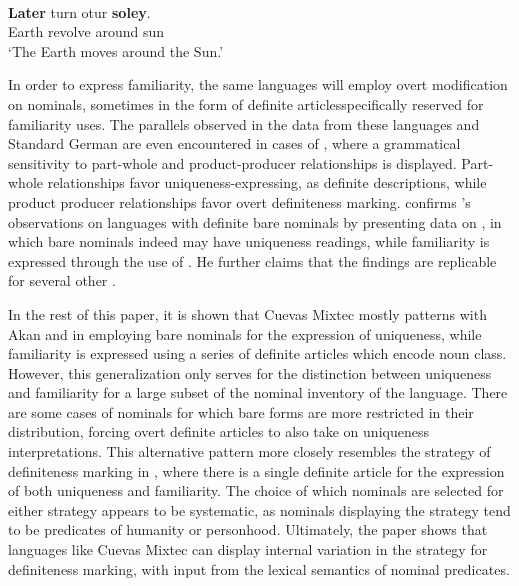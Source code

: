 \documentclass[output=paper,modfonts,nonflat]{langsci/langscibook}
\begin{document}
\begin{exe}
\ex \label{ex:cisneros:15}
 \\
\gll
\textbf{Later} turn otur \textbf{soley}.\\
Earth revolve around sun\\
\glt
`The Earth moves around the Sun.'
\end{exe}

In order to express familiarity, the same languages will employ overt modification on nominals, sometimes in the form of definite articles\linebreak specifically reserved for familiarity uses.  The parallels observed in the data from these languages and Standard German are even encountered in cases of , where a grammatical sensitivity to part-whole and product-producer relationships is displayed. Part-whole relationships favor uniqueness-expressing,  as definite descriptions, while product producer relationships favor overt definiteness marking.  \citet{Jenks2015} confirms \citeauthor{Schwarz2009}'s observations on languages with definite bare nominals by presenting data on , in which bare nominals indeed may have uniqueness readings, while familiarity is expressed through the use of .  He further claims that the findings are replicable for several other .

In the rest of this paper, it is shown that Cuevas Mixtec mostly patterns with Akan and  in employing bare nominals for the expression of uniqueness, while familiarity is expressed using a series of definite articles which encode noun class.  However, this generalization only serves for the distinction between uniqueness and familiarity for a large subset of the nominal inventory of the language.  There are some cases of nominals for which bare forms are more restricted in their distribution, forcing overt definite articles to also take on uniqueness interpretations.  This alternative pattern more closely resembles the strategy of definiteness marking in , where there is a single definite article for the expression of both uniqueness and familiarity.  The choice of which nominals are selected for either strategy appears to be systematic, as nominals displaying the  strategy tend to be predicates of humanity or personhood.  Ultimately, the paper shows that languages like Cuevas Mixtec can display internal variation in the strategy for definiteness marking, with input from the lexical semantics of nominal predicates.
\end{document}

